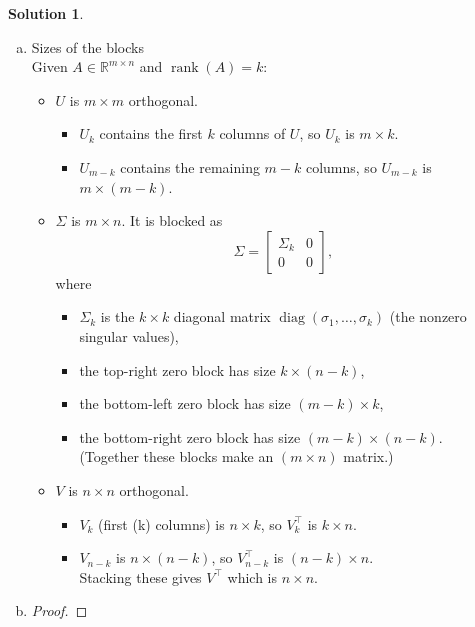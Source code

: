 \documentclass{amsart}[11pt]
\theoremstyle{definition}
\newtheorem*{solution}{Solution}
\begin{document}
\begin{solution}
    \begin{enumerate}[(a)]
        \item Sizes of the blocks\\
        Given $A\in\mathbb R^{m\times n}$ and $\operatorname{rank}(A)=k$:
        \begin{itemize}
            \item $U$ is $m\times m$ orthogonal.
            \begin{itemize}
                \item $U_k$ contains the first $k$ columns of $U$, so $U_k$ is $m\times k$.
                \item $U_{m-k}$ contains the remaining $m-k$ columns, so $U_{m-k}$ is $m\times(m-k)$.
            \end{itemize}
            \item $\Sigma$ is $m\times n$. It is blocked as
            \[\Sigma=\begin{bmatrix}\Sigma_k & 0\\ 0 & 0\end{bmatrix},\]
            where
            \begin{itemize}
                \item $\Sigma_k$ is the $k\times k$ diagonal matrix $\operatorname{diag}(\sigma_1,\dots,\sigma_k)$ (the nonzero singular values),
                \item the top-right zero block has size $k\times (n-k)$,
                \item the bottom-left zero block has size $(m-k)\times k$,
                \item the bottom-right zero block has size $(m-k)\times (n-k)$.\\(Together these blocks make an $(m\times n)$ matrix.)
            \end{itemize}
            \item $V$ is $n\times n$ orthogonal.
            \begin{itemize}
                \item $V_k$ (first (k) columns) is $n\times k$, so $V_k^\top$ is $k\times n$.
                \item $V_{n-k}$ is $n\times(n-k)$, so $V_{n-k}^\top$ is $(n-k)\times n$.\\Stacking these gives $V^\top$ which is $n\times n$.
            \end{itemize}
        \end{itemize}
        \item \begin{proof}

\end{proof}
\end{enumerate}
\end{solution}
\end{document}
